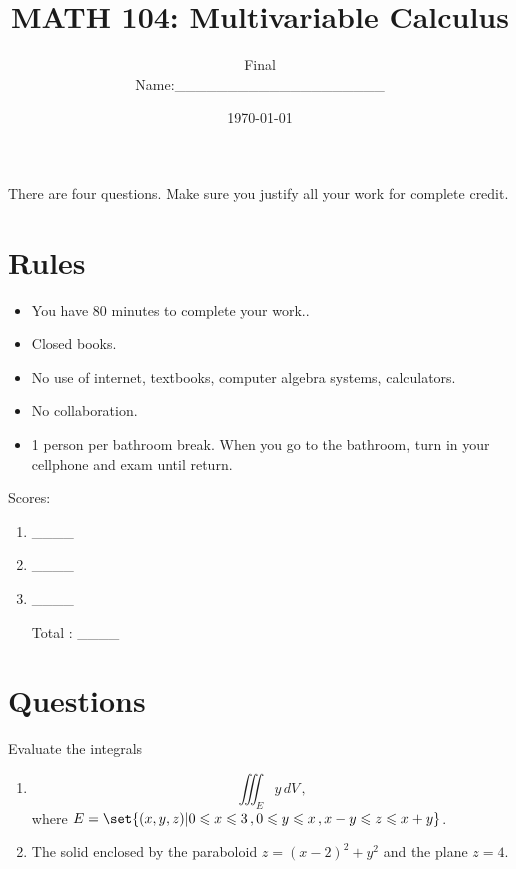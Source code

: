 \documentclass[12pt]{amsart}
\title{ MATH 104: Multivariable Calculus }
\author{Final\\ Name:\_\_\_\_\_\_\_\_\_\_\_\_\_\_\_\_\_\_\_\_}
\date{\today}
\begin{document}
\maketitle

There are four questions. Make sure you justify all your work for complete credit.

\section*{Rules}

\begin{itemize}[leftmargin=*]
	\item You have 80  minutes to complete your work..
	\item Closed books.
	\item No use of internet, textbooks, computer algebra systems, calculators.
	\item No collaboration.
	\item 1 person per bathroom break. When you go to the bathroom, turn in your cellphone and exam until return.
\end{itemize}


Scores:
\begin{enumerate}
	\item \_\_\_\_
	\item \_\_\_\_
	\item \_\_\_\_
	\item[Total]: \_\_\_\_
\end{enumerate}

\newpage

\section*{Questions}
\begin{problem}
Evaluate the integrals
\begin{enumerate}
	\item
	      \begin{equation*}
		      \iiint_E y \, dV \,,
	      \end{equation*}
	      where $E = \set{ (x,y,z) | 0 \leq x \leq 3\,, 0\leq y \leq x \,, x - y \leq z \leq x+y  } $.

	      \vspace{8cm}

	\item The solid enclosed by the paraboloid $z = (x-2)^2 + y^2$ and the plane $ z  = 4$.


\end{enumerate}
\end{problem}
\end{document}
